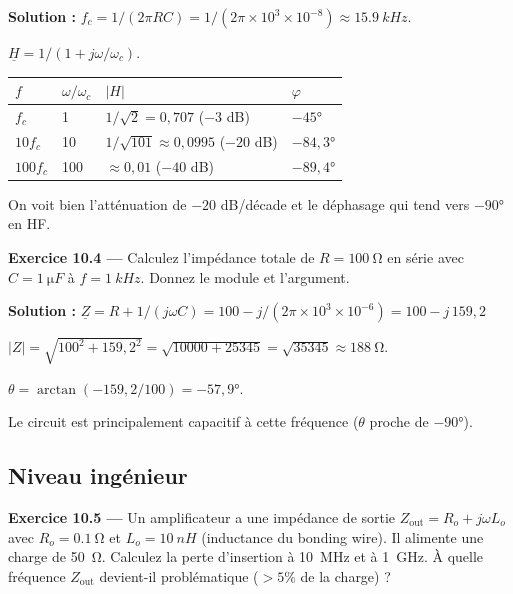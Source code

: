\documentclass[12pt,a4paper,twoside]{book}
\begin{document}
\begin{pratique}
\textbf{Solution :} $f_c = 1/(2\pi RC) = 1/(2\pi\times10^3\times10^{-8}) \approx \SI{15.9}{kHz}$.

$\underline{H} = 1/(1 + j\omega/\omega_c)$.

\begin{tabular}{llll}
\toprule
$f$ & $\omega/\omega_c$ & $|H|$ & $\varphi$ \\
\midrule
$f_c$ & 1 & $1/\sqrt{2} = 0{,}707$ ($-3$ dB) & $-45°$ \\
$10f_c$ & 10 & $1/\sqrt{101} \approx 0{,}0995$ ($-20$ dB) & $-84{,}3°$ \\
$100f_c$ & 100 & $\approx 0{,}01$ ($-40$ dB) & $-89{,}4°$ \\
\bottomrule
\end{tabular}

On voit bien l'atténuation de $-20$ dB/décade et le déphasage qui tend vers $-90°$ en HF.
\end{pratique}

\textbf{Exercice 10.4 ---} Calculez l'impédance totale de $R = \SI{100}{\ohm}$ en série avec $C = \SI{1}{\micro F}$ à $f = \SI{1}{kHz}$. Donnez le module et l'argument.

\begin{pratique}
\textbf{Solution :} $\underline{Z} = R + 1/(j\omega C) = 100 - j/(2\pi\times10^3\times10^{-6}) = 100 - j\,159{,}2$

$|Z| = \sqrt{100^2 + 159{,}2^2} = \sqrt{10000 + 25345} = \sqrt{35345} \approx \SI{188}{\ohm}$.

$\theta = \arctan(-159{,}2/100) = -57{,}9°$.

Le circuit est principalement capacitif à cette fréquence ($\theta$ proche de $-90°$).
\end{pratique}

\subsection*{Niveau ingénieur}

\textbf{Exercice 10.5 ---} Un amplificateur a une impédance de sortie $Z_{\text{out}} = R_o + j\omega L_o$ avec $R_o = \SI{0.1}{\ohm}$ et $L_o = \SI{10}{nH}$ (inductance du bonding wire). Il alimente une charge de \SI{50}{\ohm}. Calculez la perte d'insertion à \SI{10}{MHz} et à \SI{1}{GHz}. À quelle fréquence $Z_{\text{out}}$ devient-il problématique ($> 5\%$ de la charge) ?
\end{document}

